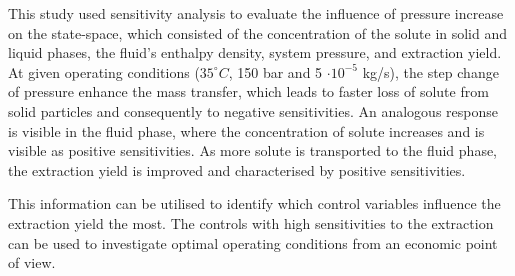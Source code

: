 \documentclass[a4paper,fleqn]{cas-dc}
\begin{document}
This study used sensitivity analysis to evaluate the influence of pressure increase on the state-space, which consisted of the concentration of the solute in solid and liquid phases, the fluid's enthalpy density, system pressure, and extraction yield. At given operating conditions ($35^\circ C$, 150 bar and 5 $\cdot 10^{-5}$ kg/s), the step change of pressure enhance the mass transfer, which leads to faster loss of solute from solid particles and consequently to negative sensitivities. An analogous response is visible in the fluid phase, where the concentration of solute increases and is visible as positive sensitivities. As more solute is transported to the fluid phase, the extraction yield is improved and characterised by positive sensitivities.

This information can be utilised to identify which control variables influence the extraction yield the most. The controls with high sensitivities to the extraction can be used to investigate optimal operating conditions from an economic point of view.


%


\end{document}
